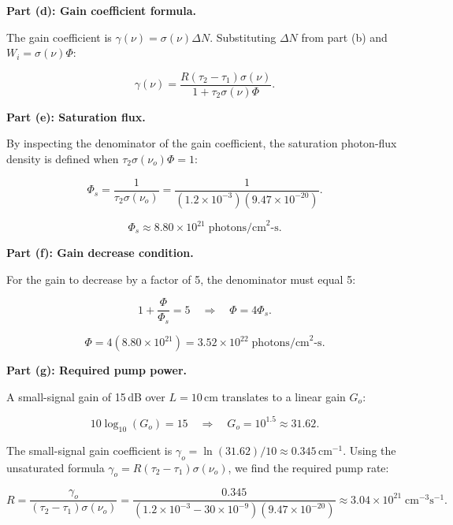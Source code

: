 \textbf{Part (d): Gain coefficient formula.}

The gain coefficient is $\gamma(\nu) = \sigma(\nu)\Delta N$. Substituting $\Delta N$ from part (b) and $W_i = \sigma(\nu)\Phi$:

\begin{equation*}
  \boxed{\gamma(\nu) = \frac{R(\tau_2 - \tau_1)\sigma(\nu)}{1 + \tau_2\sigma(\nu)\Phi}.}
\end{equation*}

\textbf{Part (e): Saturation flux.}

By inspecting the denominator of the gain coefficient, the saturation photon-flux density is defined when $\tau_2\sigma(\nu_o)\Phi = 1$:

\begin{equation*}
  \Phi_s = \frac{1}{\tau_2\sigma(\nu_o)} = \frac{1}{(1.2\times10^{-3})(9.47\times10^{-20})}.
\end{equation*}

\begin{equation*}
  \boxed{\Phi_s \approx 8.80\times10^{21}\;\text{photons/cm}^{2}\text{-s}.}
\end{equation*}

\textbf{Part (f): Gain decrease condition.}

For the gain to decrease by a factor of 5, the denominator must equal 5:

\begin{equation*}
  1 + \frac{\Phi}{\Phi_s} = 5 \quad\Longrightarrow\quad \Phi = 4\Phi_s.
\end{equation*}

\begin{equation*}
  \boxed{\Phi = 4(8.80\times10^{21}) = 3.52\times10^{22}\;\text{photons/cm}^{2}\text{-s}.}
\end{equation*}

\textbf{Part (g): Required pump power.}

A small-signal gain of 15\,dB over $L=10$\,cm translates to a linear gain $G_o$:

\begin{equation*}
  10\log_{10}(G_o) = 15 \quad\Longrightarrow\quad G_o = 10^{1.5} \approx 31.62.
\end{equation*}

The small-signal gain coefficient is $\gamma_o = \ln(31.62)/10 \approx 0.345$\,cm$^{-1}$.
Using the unsaturated formula $\gamma_o = R(\tau_2 - \tau_1)\sigma(\nu_o)$, we find the required pump rate:

\begin{equation*}
  R = \frac{\gamma_o}{(\tau_2 - \tau_1)\sigma(\nu_o)}
  = \frac{0.345}{(1.2\times10^{-3} - 30\times10^{-9})(9.47\times10^{-20})}
  \approx 3.04\times10^{21}\;\text{cm}^{-3}\text{s}^{-1}.
\end{equation*}

